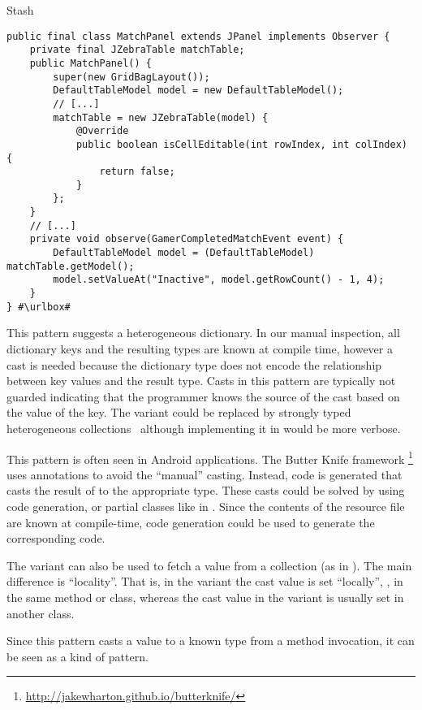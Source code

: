 \begin{pattern}{Stash}
\def\urlvar{http://bit.ly/ggp_org_ggp_base_2SAEXHu}
\begin{verbatim}
public final class MatchPanel extends JPanel implements Observer {
    private final JZebraTable matchTable;
    public MatchPanel() {
        super(new GridBagLayout());
        DefaultTableModel model = new DefaultTableModel();
        // [...]
        matchTable = new JZebraTable(model) {
            @Override
            public boolean isCellEditable(int rowIndex, int colIndex) {
                return false;
            }
        };
    }
    // [...]
    private void observe(GamerCompletedMatchEvent event) {
        DefaultTableModel model = (DefaultTableModel) matchTable.getModel();
        model.setValueAt("Inactive", model.getRowCount() - 1, 4);
    }
} #\urlbox#
\end{verbatim}

\detection{}

\issues{}
This pattern suggests a heterogeneous dictionary.
In our manual inspection,
all dictionary keys and the resulting types are known at compile time,
however a cast is needed because the dictionary type does not encode the
relationship between key values and the result type.
Casts in this pattern are typically not guarded indicating that the programmer knows the source of the cast based on the value of the key.
The  variant could be replaced by 
strongly typed heterogeneous collections~\citep{kiselyovStronglyTypedHeterogeneous2004} although implementing it in \java{} would be more verbose.

This pattern is often seen in Android applications.
The Butter Knife framework%
\footnote{\url{http://jakewharton.github.io/butterknife/}}
uses annotations to avoid the ``manual'' casting.
Instead, code is generated that casts the result of  to the appropriate type.
These casts could be solved by using code generation,
or partial classes like in \csharp{}.
Since the contents of the resource file are known at compile-time,
code generation could be used to generate the corresponding \java{} code.

The  variant can also be used to fetch a value from a collection
(as in ).
The main difference is ``locality''.
That is, in the  variant the cast value is set ``locally'', \ie,
in the same method or class,
whereas the cast value in the  variant is usually set in another class.

Since this pattern casts a value to a known type from a method invocation,
it can be seen as a kind of  pattern.

\end{pattern}

